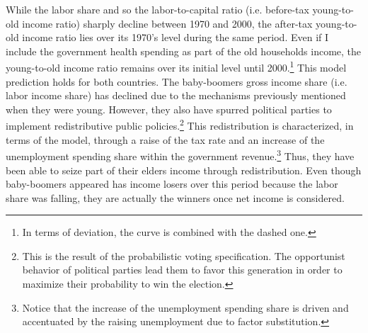 While the labor share and so the labor-to-capital ratio (i.e. before-tax young-to-old income ratio) sharply decline between 1970 and 2000, the after-tax young-to-old income ratio lies over its 1970's level during the same period. Even if I include the government health spending as part of the old households income, the young-to-old income ratio remains over its initial level until 2000.\footnote{In terms of deviation, the curve is combined with the dashed one.} This model prediction holds for both countries. The baby-boomers gross income share (i.e. labor income share) has declined due to the mechanisms previously mentioned when they were young. However, they also have spurred political parties to implement redistributive public policies.\footnote{This is the result of the probabilistic voting specification. The opportunist behavior of political parties lead them to favor this generation in order to maximize their probability to win the election.} This redistribution is characterized, in terms of the model, through a raise of the tax rate and an increase of the unemployment spending share within the government revenue.\footnote{Notice that the increase of the unemployment spending share is driven and accentuated by the raising unemployment due to factor substitution.} Thus, they have been able to seize part of their elders income through redistribution. Even though baby-boomers appeared has income losers over this period because the labor share was falling, they are actually the winners once net income is considered.

